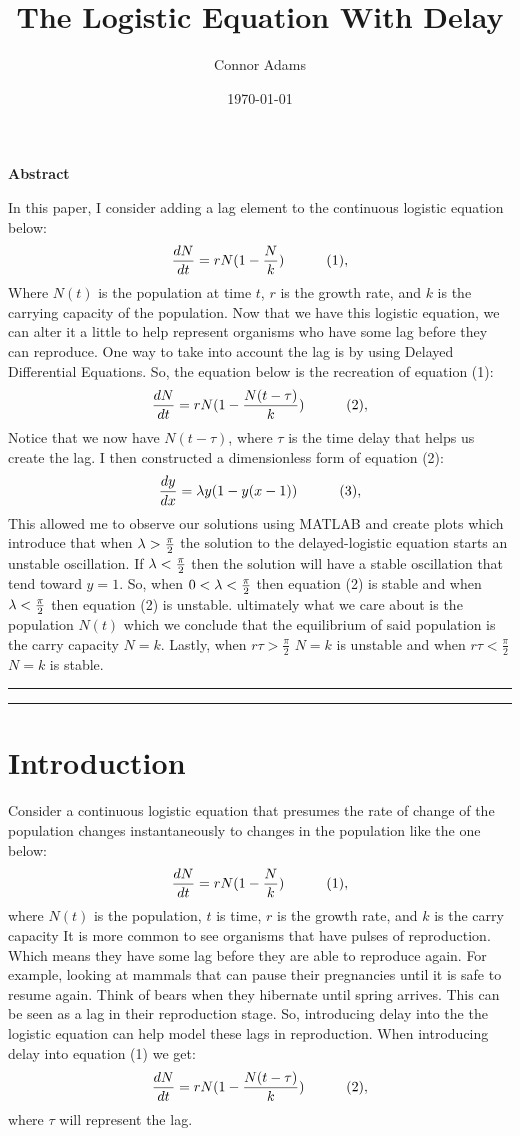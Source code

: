 \documentclass{article}
\title{\textbf{The Logistic Equation With Delay}}
\author{\LARGE Connor Adams }
\date{\today}
\begin{document}
\maketitle

\setlength\parindent{0pt}

\textbf{\Large Abstract}
\bigskip

\setlength\parindent{10pt}

\indent \indent \large In this paper, I consider adding a lag element to the continuous logistic equation below:
   $$ \frac{dN}{dt} = rN(1-\frac{N}{k})\indent\indent (1),$$
Where $N(t)$ is the population at time $t$, $r$ is the growth rate, and $k$ is the carrying capacity of the population. Now that we have this logistic equation, we can alter it a little to help represent organisms who have some lag before they can reproduce. One way to take into account the lag is by using Delayed Differential Equations. So, the equation below is the recreation of equation (1):
$$ \frac{dN}{dt} = rN(1-\frac{N(t-\tau)}{k})\indent\indent (2),$$ Notice that we now have $N(t-\tau)$, where $\tau$ is the time delay that helps us create the lag. I then constructed a dimensionless form of equation (2): 
$$ \frac{dy}{dx} = \lambda y(1-y(x-1))\indent\indent (3),$$ 
This allowed me to observe our solutions using MATLAB and create plots which introduce that when $\lambda >\LARGE \frac{\pi}{2}$ the solution to the delayed-logistic equation starts an unstable oscillation. If $\lambda < \LARGE \frac{\pi}{2}$ then the solution will have a stable oscillation that tend toward $y = 1$. So, when $0 < \lambda < \LARGE \frac{\pi}{2}$ then equation (2) is stable and when $\lambda < \LARGE \frac{\pi}{2}$ then equation (2) is unstable. ultimately what we care about is the population $N(t)$ which we conclude that the equilibrium of said population is the carry capacity $N = k$. Lastly, when $r \tau > \frac{\pi}{2}$ $N = k$ is unstable and when
$r \tau < \frac{\pi}{2}$ $N = k$ is stable.
\bigskip
\hrule\hrule
\medskip

\section{Introduction}
\indent \indent Consider a continuous logistic equation that presumes the rate of change of the population changes
instantaneously to changes in the population like the one below:
$$\frac{dN}{dt} = rN(1-\frac{N}{k})\indent\indent (1),$$
where $N(t)$ is the population, $t$ is time, $r$ is the growth rate, and $k$ is the carry capacity It is more common to see organisms that have pulses of reproduction. Which means they have some lag before they are able to reproduce again. For example, looking at mammals that can pause their pregnancies until it is safe to resume again. Think of bears when they hibernate until spring arrives. This can be seen as a lag in their reproduction stage. So, introducing delay into the the logistic equation can help model these lags in reproduction. When introducing delay into equation (1) we get:
$$ \frac{dN}{dt} = rN(1-\frac{N(t-\tau)}{k})\indent\indent (2),$$
where $\tau$ will represent the lag. 
\end{document}
